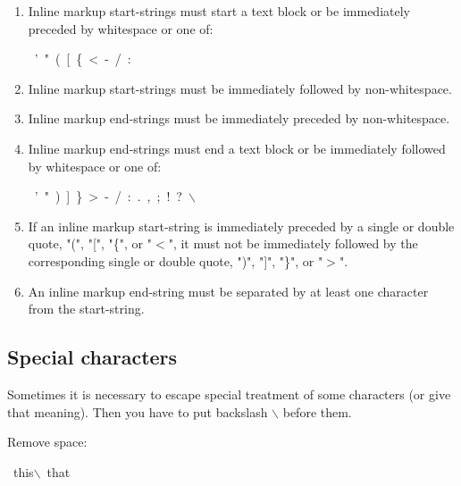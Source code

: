 \documentclass[12pt]{article}
\begin{document}
\begin{enumerate}[label=\arabic*.]
\item
Inline markup start-strings must start a text block or be
immediately preceded by whitespace or one of:

\begin{ttfamily}\begin{flushleft}
\mbox{~'~"~(~[~\{~<~-~/~:}\\
\end{flushleft}\end{ttfamily}

\item
Inline markup start-strings must be immediately followed by
non-whitespace.

\item
Inline markup end-strings must be immediately preceded by
non-whitespace.

\item
Inline markup end-strings must end a text block or be immediately
followed by whitespace or one of:

\begin{ttfamily}\begin{flushleft}
\mbox{~'~"~)~]~\}~>~-~/~:~.~,~;~!~?~$\backslash$}\\
\end{flushleft}\end{ttfamily}

\item
If an inline markup start-string is immediately preceded by a
single or double quote, "(", "[", "\{", or "$<$", it must not be
immediately followed by the corresponding single or double quote,
")", "]", "\}", or "$>$".

\item
An inline markup end-string must be separated by at least one
character from the start-string.
\end{enumerate}
\hypertarget{lspecial-characters}{}
\subsection{Special characters}

Sometimes it is necessary to escape special treatment of some
characters (or give that meaning). Then you have to put backslash \texttt{$\backslash$}
before them.

Remove space:

\begin{ttfamily}\begin{flushleft}
\mbox{~this$\backslash$~that}\\
\end{flushleft}\end{ttfamily}
\end{document}
